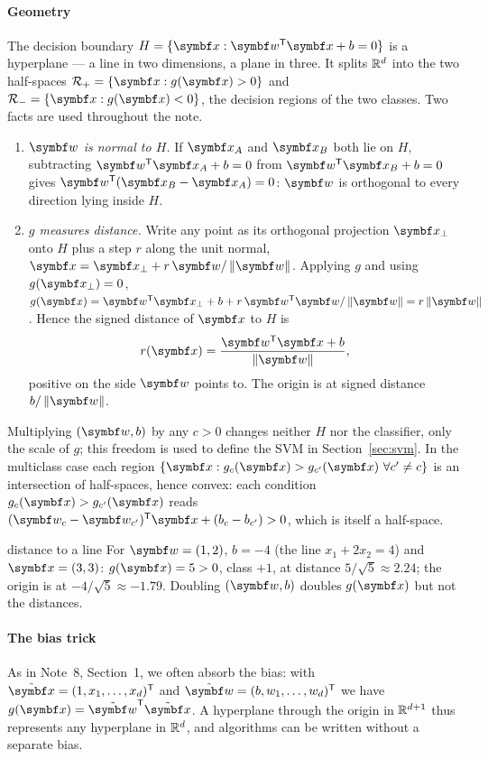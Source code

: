 \documentclass[11pt]{article}
\newcommand{\w}{\vect{w}}
\newcommand{\xt}{\tilde{\x}}
\newcommand{\wt}{\tilde{\w}}
\begin{document}
\paragraph{Geometry} The decision boundary $H = \{\x : \w\T\x + b = 0\}$ is a hyperplane --- a line in two dimensions, a
plane in three. It splits $\mathbb{R}^d$ into the two half-spaces $\mathcal R_+ = \{\x : g(\x) > 0\}$ and $\mathcal R_- = \{\x :
g(\x) < 0\}$, the decision regions of the two classes. Two facts are used throughout the note.
\begin{enumerate}
\item \emph{$\w$ is normal to $H$.} If $\x_A$ and $\x_B$ both lie on $H$, subtracting $\w\T\x_A + b = 0$ from
$\w\T\x_B + b = 0$ gives $\w\T(\x_B - \x_A) = 0$: $\w$ is orthogonal to every direction lying inside $H$.
\item \emph{$g$ measures distance.} Write any point as its orthogonal projection $\x_\perp$ onto $H$ plus a step $r$
along the unit normal, $\x = \x_\perp + r\,\w/\norm{\w}$. Applying $g$ and using $g(\x_\perp) = 0$,
$g(\x) = \w\T\x_\perp + b + r\,\w\T\w/\norm{\w} = r\norm{\w}$. Hence the signed distance of $\x$ to $H$ is
\begin{equation}\label{eq:dist}
  r(\x) = \frac{\w\T\x + b}{\norm{\w}} ,
\end{equation}
positive on the side $\w$ points to. The origin is at signed distance $b/\norm{\w}$.
\end{enumerate}
Multiplying $(\w, b)$ by any $c > 0$ changes neither $H$ nor the classifier, only the scale of $g$; this freedom is
used to define the SVM in Section~\ref{sec:svm}. In the multiclass case each region
$\{\x : g_c(\x) > g_{c'}(\x)\ \forall c' \ne c\}$ is an intersection of half-spaces, hence convex: each condition
$g_c(\x) > g_{c'}(\x)$ reads $(\w_c - \w_{c'})\T\x + (b_c - b_{c'}) > 0$, which is itself a half-space.

\begin{worked}{distance to a line}
For $\w = (1, 2)$, $b = -4$ (the line $x_1 + 2x_2 = 4$) and $\x = (3, 3)$: $g(\x) = 5 > 0$, class $+1$, at distance
$5/\sqrt5 \approx 2.24$; the origin is at $-4/\sqrt5 \approx -1.79$. Doubling $(\w, b)$ doubles $g(\x)$ but not the
distances.
\end{worked}

\paragraph{The bias trick} As in Note~8, Section~1, we often absorb the bias: with $\xt = (1, x_1, \dots, x_d)\T$ and
$\wt = (b, w_1, \dots, w_d)\T$ we have $g(\x) = \wt\T\xt$. A hyperplane through the origin in $\mathbb{R}^{d+1}$ thus represents
any hyperplane in $\mathbb{R}^d$, and algorithms can be written without a separate bias.
\end{document}
